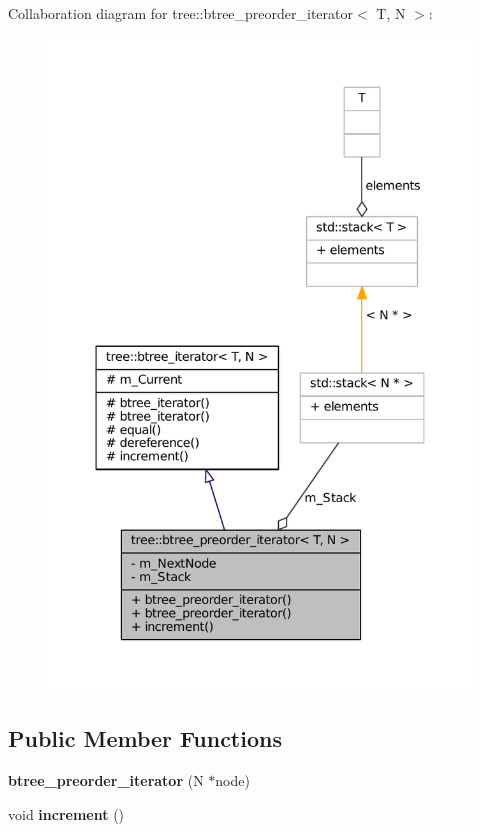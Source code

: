 \-Collaboration diagram for tree\-:\-:btree\-\_\-preorder\-\_\-iterator$<$ \-T, \-N $>$\-:
\nopagebreak
\begin{figure}[H]
\begin{center}
\leavevmode
\includegraphics[width=347pt]{classtree_1_1btree__preorder__iterator__coll__graph}
\end{center}
\end{figure}
\subsection*{\-Public \-Member \-Functions}
\begin{DoxyCompactItemize}
\item 
\hypertarget{classtree_1_1btree__preorder__iterator_a2d2e4be80bd9f420f209465b595fb146}{{\bfseries btree\-\_\-preorder\-\_\-iterator} (\-N $\ast$node)}\label{classtree_1_1btree__preorder__iterator_a2d2e4be80bd9f420f209465b595fb146}

\item 
\hypertarget{classtree_1_1btree__preorder__iterator_afa601bda88a4be48f38d6438260f0001}{void {\bfseries increment} ()}\label{classtree_1_1btree__preorder__iterator_afa601bda88a4be48f38d6438260f0001}

\end{DoxyCompactItemize}
